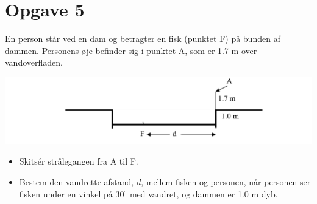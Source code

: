 \documentclass[a4paper, 12pt]{article}
\begin{document}
\newpage
\section*{Opgave 5}
\label{sec:orgad6e349}

En person står ved en dam og betragter en fisk (punktet F) på bunden af dammen. Personens øje befinder sig i punktet A, som er 1.7 m over vandoverfladen.

\begin{center}
\includegraphics[width=.9\linewidth]{./img/dam.png}
\end{center}

\begin{itemize}
\item Skitsér strålegangen fra A til F.

\item Bestem den vandrette afstand, \(d\), mellem fisken og personen, når personen ser fisken under en vinkel på \(30^\circ\) med vandret, og dammen er 1.0 m dyb.
\end{itemize}
\end{document}
